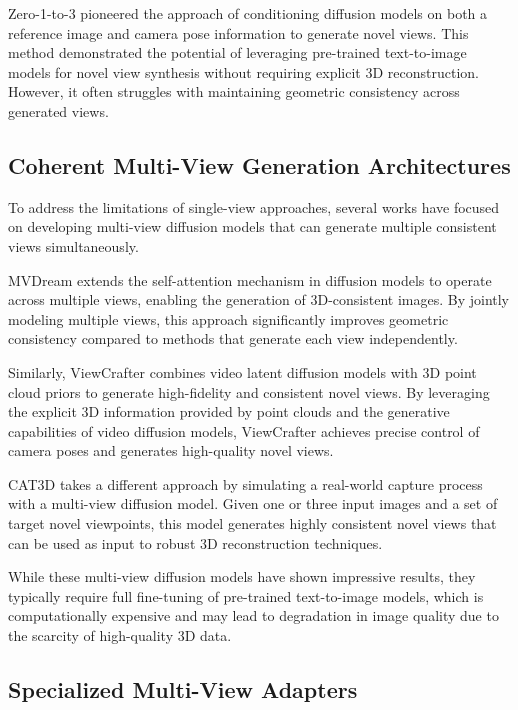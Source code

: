 Zero-1-to-3 \cite{zero1to3} pioneered the approach of conditioning diffusion models on both a reference image and camera pose information to generate novel views. This method demonstrated the potential of leveraging pre-trained text-to-image models for novel view synthesis without requiring explicit 3D reconstruction. However, it often struggles with maintaining geometric consistency across generated views.

\subsection{Coherent Multi-View Generation Architectures}

To address the limitations of single-view approaches, several works have focused on developing multi-view diffusion models that can generate multiple consistent views simultaneously.

MVDream \cite{mvdream} extends the self-attention mechanism in diffusion models to operate across multiple views, enabling the generation of 3D-consistent images. By jointly modeling multiple views, this approach significantly improves geometric consistency compared to methods that generate each view independently.

Similarly, ViewCrafter \cite{viewcrafter} combines video latent diffusion models \cite{videolatentdiffusion} with 3D point cloud priors to generate high-fidelity and consistent novel views. By leveraging the explicit 3D information provided by point clouds and the generative capabilities of video diffusion models, ViewCrafter achieves precise control of camera poses and generates high-quality novel views.

CAT3D \cite{cat3d} takes a different approach by simulating a real-world capture process with a multi-view diffusion model. Given one or three input images and a set of target novel viewpoints, this model generates highly consistent novel views that can be used as input to robust 3D reconstruction techniques.

While these multi-view diffusion models have shown impressive results, they typically require full fine-tuning of pre-trained text-to-image models, which is computationally expensive and may lead to degradation in image quality due to the scarcity of high-quality 3D data.

\subsection{Specialized Multi-View Adapters}

